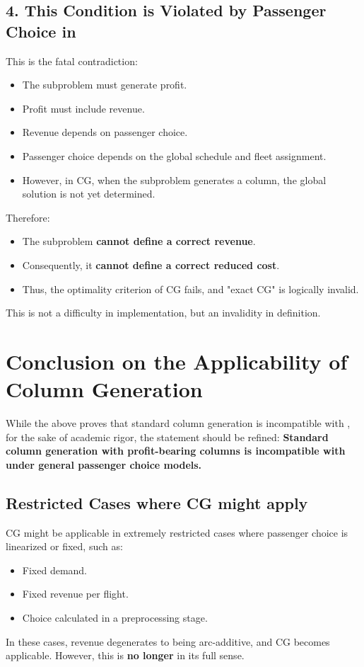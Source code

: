 \subsection*{4. This Condition is Violated by Passenger Choice in \problemName}

This is the fatal contradiction:
\begin{itemize}
    \item The subproblem must generate profit.
    \item Profit must include revenue.
    \item Revenue depends on passenger choice.
    \item Passenger choice depends on the global schedule and fleet assignment.
    \item However, in CG, when the subproblem generates a column, the global solution is not yet determined.
\end{itemize}

Therefore:
\begin{itemize}
    \item The subproblem \textbf{cannot define a correct revenue}.
    \item Consequently, it \textbf{cannot define a correct reduced cost}.
    \item Thus, the optimality criterion of CG fails, and "exact CG" is logically invalid.
\end{itemize}
This is not a difficulty in implementation, but an invalidity in definition.

\section{Conclusion on the Applicability of Column Generation}

While the above proves that standard column generation is incompatible with \problemName, for the sake of academic rigor, the statement should be refined:
\textbf{Standard column generation with profit-bearing columns is incompatible with \problemName under general passenger choice models.}

\subsection*{Restricted Cases where CG might apply}

CG might be applicable in extremely restricted cases where passenger choice is linearized or fixed, such as:
\begin{itemize}
    \item Fixed demand.
    \item Fixed revenue per flight.
    \item Choice calculated in a preprocessing stage.
\end{itemize}
In these cases, revenue degenerates to being arc-additive, and CG becomes applicable. However, this is \textbf{no longer \problemName} in its full sense.

